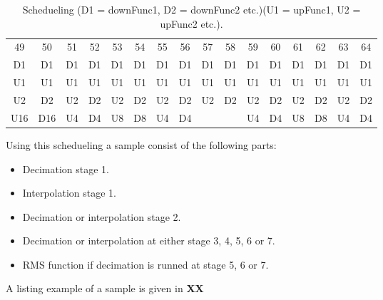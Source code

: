 \begin{table}[H]
\begin{tabular}{|c|c|c|c|c|c|c|c|c|c|c|c|c|c|c|c|}
\rowcolor[HTML]{C0C0C0} 
\multicolumn{16}{|c|}{\cellcolor[HTML]{C0C0C0}Sample}                             \\ \hline
\rowcolor[HTML]{C0C0C0} 
49  & 50  & 51 & 52 & 53 & 54 & 55 & 56 & 57  & 58  & 59 & 60 & 61 & 62 & 63 & 64 \\ \hline
D1  & D1  & D1 & D1 & D1 & D1 & D1 & D1 & D1  & D1  & D1 & D1 & D1 & D1 & D1 & D1 \\ \hline
U1  & U1  & U1 & U1 & U1 & U1 & U1 & U1 & U1  & U1  & U1 & U1 & U1 & U1 & U1 & U1 \\ \hline
U2  & D2  & U2 & D2 & U2 & D2 & U2 & D2 & U2  & D2  & U2 & D2 & U2 & D2 & U2 & D2 \\ \hline
U16 & D16 & U4 & D4 & U8 & D8 & U4 & D4 &     &     & U4 & D4 & U8 & D8 & U4 & D4 \\ \hline
\end{tabular}
\caption{Schedueling (D1 = downFunc1, D2 = downFunc2 etc.)(U1 = upFunc1, U2 = upFunc2 etc.).}
\label{tb:schedueling}
\end{table}


Using this schedueling a sample consist of the following parts:
\begin{itemize}
\item Decimation stage 1.
\item Interpolation stage 1.
\item Decimation or interpolation stage 2.
\item Decimation or interpolation at either stage 3, 4, 5, 6 or 7. 
\item RMS function if decimation is runned at stage 5, 6 or 7.
\end{itemize}

A listing example of a sample is given in \textbf{XX} 

